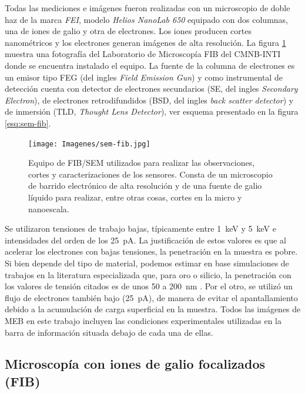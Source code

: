 		Todas las mediciones e imágenes fueron realizadas con un microscopio de doble haz de la marca \textit{FEI}, modelo \textit{Helios NanoLab 650} equipado con dos columnas, una de iones de galio y otra de electrones. Los iones producen cortes nanométricos y los electrones generan imágenes de alta resolución. La figura \ref{fig:sem-fib} muestra una fotografía del Laboratorio de Microscopía FIB del CMNB-INTI donde se encuentra instalado el equipo. La fuente de la columna de electrones es un emisor tipo FEG (del ingles \textit{Field Emission Gun}) y como instrumental de detección cuenta con detector de electrones secundarios (SE, del ingles \textit{Secondary Electron}), de electrones retrodifundidos (BSD, del ingles \textit{back scatter detector}) y de inmersión (TLD, \textit{Thought Lens Detector}), ver esquema presentado en la figura \ref{esq:sem-fib}. 

				\begin{figure}[bh!]
			 		  \begin{center}
			 		  \texttt{[image: Imagenes/sem-fib.jpg]}
			 		  \caption[Microscopio de doble haz FIB/SEM]{Equipo de FIB/SEM utilizados para realizar las observaciones, cortes y caracterizaciones de los sensores. Consta de un microscopio de barrido electrónico de alta resolución y de una fuente de galio líquido para realizar, entre otras cosas, cortes en la micro y nanoescala.}
			 		  \label{fig:sem-fib}
			 		  \end{center}
			 		  \end{figure}
	
		Se utilizaron tensiones de trabajo bajas, típicamente entre \SI{1}{\kilo\electronvolt} y \SI{5}{\kilo\electronvolt} e intensidades del orden de los \SI{25}{\pA}. La justificación de estos valores es que al acelerar los electrones con bajas tensiones, la penetración en la muestra es pobre. Si bien depende del tipo de material, podemos estimar en base simulaciones de trabajos en la literatura especializada que, para oro o silicio, la penetración con los valores de tensión citados es de unos 50 a \SI{200}{\nm} \cite{Joy1984,Shur2012,Hafner2007}. Por el otro, se utilizó un flujo de electrones también bajo (\SI{25}{\pA}), de manera de evitar el apantallamiento debido a la acumulación de carga superficial en la muestra. Todos las imágenes de MEB en este trabajo incluyen las condiciones experimentales utilizadas en la barra de información situada debajo de cada una de ellas.

	\subsection{Microscopía con iones de galio focalizados (FIB)}\label{sec:FIB}

